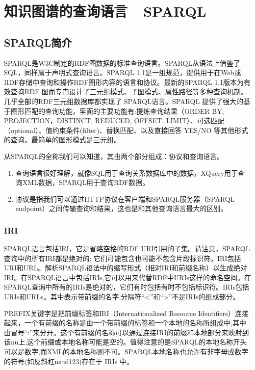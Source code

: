 \chapter{知识图谱的查询语言---SPARQL}\label{sec:SPARQLIntroduction}
\section{SPARQL简介}
SPARQL是W3C制定的RDF图数据的标准查询语言。SPARQL从语法上借鉴了SQL，同样属于声明式查询语言。SPARQL 1.1是一组规范，提供用于在Web或RDF存储中查询和操作RDF图形内容的语言和协议。最新的SPARQL 1.1版本为有效查询RDF 图而专门设计了三元组模式、子图模式、属性路径等多种查询机制。几乎全部的RDF三元组数据库都实现了 SPARQL语言。SPARQL 提供了强大的基于图形匹配的查询功能，里面的主要功能有:提炼查询结果（ORDER BY, PROJECTION，DISTINCT, REDUCED, OFFSET, LIMIT）、可选匹配 （optional）、值约束条件(filter)、替换匹配、以及直接回答 YES/NO 等其他形式的查询。最简单的图形模式是三元组。

从SPARQL的全称我们可以知道，其由两个部分组成：协议和查询语言。


\begin{enumerate}
  \item 查询语言很好理解，就像SQL用于查询关系数据库中的数据，XQuery用于查询XML数据，SPARQL用于查询RDF数据。
  \item 协议是指我们可以通过HTTP协议在客户端和SPARQL服务器（SPARQL endpoint）之间传输查询和结果，这也是和其他查询语言最大的区别。
\end{enumerate}


\subsection{IRI}
SPARQL语言包括IRI，它是省略空格的RDF URI引用的子集。请注意，SPARQL查询中的所有IRI都是绝对的; 它们可能包含也可能不包含片段标识符。IRI包括URI和URL。解析SPARQL语法中的缩写形式（相对IRI和前缀名称）以生成绝对IRI。在SPARQL语言中包括IRIs,它可以用来代替RDF中URIs这样的命名空间。在SPARQL查询中所有的IRIs是绝对的，它们有时包括有时不包括标识符。IRIs包括URIs和URLs。其中表示带前缀的名字,分隔符“<”和“>”不是IRIs的组成部分。



PREFIX关键字是把前缀标签和IRI（Internationalized Resource Identifiers）连接起来，一个有前缀的名称是由一个带前缀的标签和一个本地的名称所组成中,其中由冒号“:”来分开。这个有前缀的名称可以通过连接IRI的前缀和本地部分来映射到该nu上,这个前缀或本地名称可能是空的。值得注意的是SPARQL的本地名称开头可以是数字,而XML的本地名称则不可。SPARQL本地名称也允许有非字母或数字的符号(如反斜杠ns:id\=123)存在于 IRIs 中。


